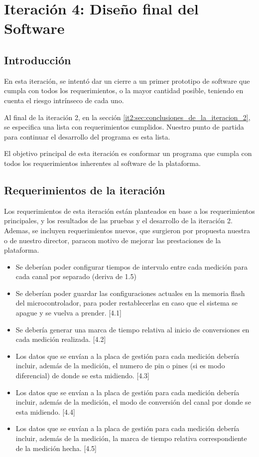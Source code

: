 \chapter{Iteración 4: Diseño final del Software} %
\label{cha:iteracion_4}

\section{Introducción} %
\label{it5:sec:introduccion}

En esta iteración, se intentó dar un cierre a un primer prototipo de software que cumpla con todos los requerimientos, o la mayor cantidad posible, teniendo en cuenta el riesgo intrínseco de cada uno.

Al final de la iteración 2, en la sección \ref{it2:sec:conclusiones_de_la_iteracion_2}, se especifica una lista con requerimientos cumplidos. Nuestro punto de partida para continuar el desarrollo del programa es esta lista. 

El objetivo principal de esta iteración es conformar un programa que cumpla con todos los requerimientos inherentes al software de la plataforma.


\section{Requerimientos de la iteración} %
\label{it5:sec:requerimientos_de_la_iteracion}

Los requerimientos de esta iteración están planteados en base a los requerimientos principales, y los resultados de las pruebas y el desarrollo de la iteración 2. Ademas, se incluyen requerimientos nuevos, que surgieron por propuesta nuestra o de nuestro director, paracon motivo de mejorar las prestaciones de la plataforma.

\begin{itemize}
\item Se deberían poder configurar tiempos de intervalo entre cada medición para cada canal por separado (deriva de 1.5)
\item Se deberían poder guardar las configuraciones actuales en la memoria flash del microcontrolador, para poder restablecerlas en caso que el sistema se apague y se vuelva a prender. [4.1]
\item Se debería generar una marca de tiempo relativa al inicio de conversiones en cada medición realizada. [4.2]
\item Los datos que se envían a la placa de gestión para cada medición debería incluir, además de la medición, el numero de pin o pines (si es modo diferencial) de donde se esta midiendo. [4.3]
\item Los datos que se envían a la placa de gestión para cada medición debería incluir, además de la medición, el modo de conversión del canal por donde se esta midiendo. [4.4]
\item Los datos que se envían a la placa de gestión para cada medición debería incluir, además de la medición, la marca de tiempo relativa correspondiente de la medición hecha. [4.5] 
\end{itemize}


